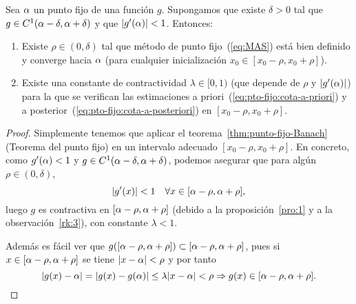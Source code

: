 \begin{theorem}
  \label{thm:punto-fijo-convergencia-local}
  Sea $\alpha$ un punto fijo de una función $g$. Supongamos que existe
  $\delta>0$ tal que $g\in C^1(\alpha-\delta,\alpha+\delta)$ y que
  $|g'(\alpha)|<1$. Entonces:
  \begin{enumerate}
  \item Existe $\rho\in (0,\delta)$ tal que método de punto
    fijo~(\ref{eq:MAS}) está bien definido y converge hacia $\alpha$
    (para cualquier inicialización $x_0 \in [x_0-\rho,x_0+\rho]$).
  \item Existe una constante de contractividad $\lambda\in [0,1)$ (que
    depende de $\rho$ y $|g'(\alpha)|$) para la que se verifican las
    estimaciones a priori~(\ref{eq:pto-fijo:cota-a-priori}) y a
    posterior~(\ref{eq:pto-fijo:cota-a-posteriori}) en
    $[x_0-\rho,x_0+\rho]$.
  \end{enumerate}
\end{theorem}
  \begin{proof}
    Simplemente tenemos que aplicar el
    teorema~\ref{thm:punto-fijo-Banach} (Teorema del punto fijo) en un
    intervalo adecuado $[x_0-\rho,x_0+\rho]$. En concreto, como
    $g'(\alpha)<1$ y $g \in C^1(\alpha-\delta,\alpha+\delta)$, podemos
    asegurar que para algún $\rho\in(0,\delta)$,
    $$
    |g'(x)|<1 \quad \forall x\in [\alpha-\rho, \alpha+\rho],
    $$
    luego $g$ es contractiva en $[\alpha-\rho, \alpha+\rho]$ (debido a
    la proposición~\ref{pro:1} y a la observación~\ref{rk:3}), con
    constante $\lambda<1$.

    Además es fácil ver que $g([\alpha-\rho, \alpha+\rho]) \subset
    [\alpha-\rho, \alpha+\rho]$, pues si $x\in[\alpha-\rho, \alpha+\rho]$
    se tiene $ |x-\alpha|<\rho$ y por tanto
    $$ 
    |g(x)-\alpha| = |g(x)-g(\alpha)| \le \lambda |x-\alpha|< \rho
    \Rightarrow g(x)\in [\alpha-\rho, \alpha+\rho].
    $$    
  \end{proof}

